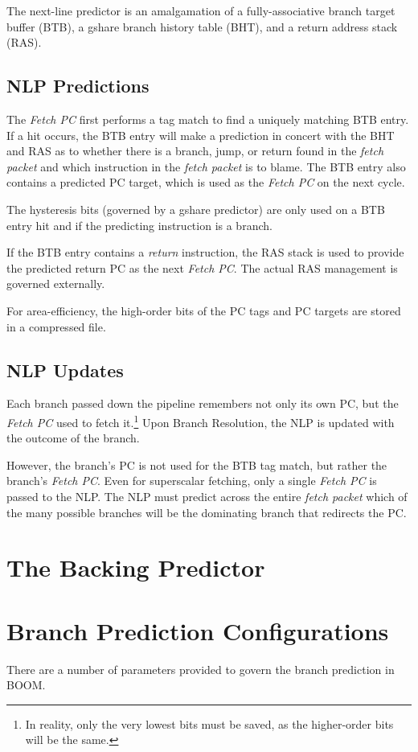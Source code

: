 The next-line predictor is an amalgamation of a fully-associative branch target buffer (BTB), a gshare branch history table (BHT), and a return address stack (RAS).  

\subsection{NLP Predictions}

The {\em Fetch PC} first performs a tag match to find a uniquely matching BTB entry.  If a hit occurs, the BTB entry will make a prediction in concert with the BHT and RAS as to whether there is a branch, jump, or return found in the {\em fetch packet} and which instruction in the {\em fetch packet} is to blame.  The BTB entry also contains a predicted PC target, which is used as the {\em Fetch PC} on the next cycle.  



The hysteresis bits (governed by a gshare predictor) are only used on a BTB entry hit and if the predicting instruction is a branch. 

If the BTB entry contains a {\em return} instruction, the RAS stack is used to provide the predicted return PC as the next {\em Fetch PC}. The actual RAS management is governed externally. 

For area-efficiency, the high-order bits of the PC tags and PC targets are stored in a compressed file.


\subsection{NLP Updates}

Each branch passed down the pipeline remembers not only its own PC, but the {\em Fetch PC} used to fetch it.\footnote{In reality, only the very lowest bits must be saved, as the higher-order bits will be the same.}  Upon Branch Resolution, the NLP is updated with the outcome of the branch.  

However, the branch's PC is not used for the BTB tag match, but rather the branch's {\em Fetch PC}.  Even for superscalar fetching, only a single {\em Fetch PC} is passed to the NLP. The NLP must predict across the entire {\em fetch packet} which of the many possible branches will be the dominating branch that redirects the PC. 


\section{The Backing Predictor}


\section{Branch Prediction Configurations}

There are a number of parameters provided to govern the branch prediction in BOOM.

 
